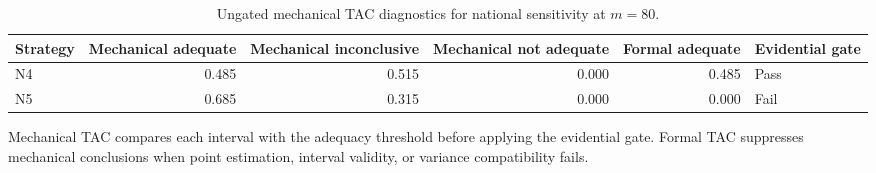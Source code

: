 \begin{table}[h!]
\centering
\small
\caption{Ungated mechanical TAC diagnostics for national sensitivity at $m=80$.}
\label{tab:nav-mechanical-tac-m80}
\begin{tabular}{lrrrrl}
\toprule
Strategy & Mechanical adequate & Mechanical inconclusive & Mechanical not adequate & Formal adequate & Evidential gate \\
\midrule
N4 & 0.485 & 0.515 & 0.000 & 0.485 & Pass \\
N5 & 0.685 & 0.315 & 0.000 & 0.000 & Fail \\
\bottomrule
\end{tabular}
\par\vspace{2pt}
\begin{minipage}{0.97\linewidth}\footnotesize Mechanical TAC compares each interval with the adequacy threshold before applying the evidential gate. Formal TAC suppresses mechanical conclusions when point estimation, interval validity, or variance compatibility fails.\end{minipage}
\end{table}

